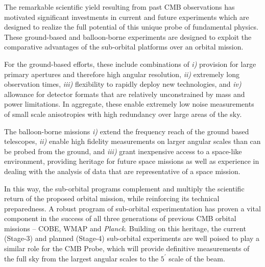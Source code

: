 %
%

The remarkable scientific yield resulting from past CMB observations
has motivated significant investments in current and future
experiments which are designed to realize the full potential of this
unique probe of fundamental physics.  These ground-based and
balloon-borne experiments are designed to exploit the comparative
advantages of the sub-orbital platforms over an orbital mission.

For the ground-based efforts, these include combinations of {\it i)}
provision for large primary apertures and therefore high angular
resolution, {\it ii)} extremely long observation times, {\it iii)}
flexibility to rapidly deploy new technologies, and {\it iv)}
allowance for detector formats that are relatively unconstrained by
mass and power limitations.  In aggregate, these enable extremely low
noise measurements of small scale anisotropies with high redundancy
over large areas of the sky.

The balloon-borne missions {\it i)} extend the frequency reach of the
ground based telescopes, {\it ii)} enable high fidelity measurements
on larger angular scales than can be probed from the ground, and {\it
  iii)} grant inexpensive access to a space-like environment,
providing heritage for future space missions as well as experience in
dealing with the analysis of data that are representative of a space
mission.

In this way, the sub-orbital programs complement and multiply the
scientific return of the proposed orbital mission, while reinforcing
its technical preparedness.  A robust program of sub-orbital
experimentation has proven a vital component in the success of all
three generations of previous CMB orbital missions -- COBE, WMAP and
{\it Planck}. Building on this heritage, the current (Stage-3) and
planned (Stage-4) sub-orbital experiments are well poised to play a
similar role for the CMB Probe, which will provide definitive
measurements of the full sky from the largest angular scales to the
$5^\prime$ scale of the beam.







